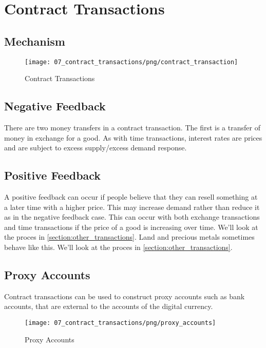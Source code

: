 \section{Contract Transactions}
\label{section:contract_transactions}

\subsection{Mechanism}

\begin{figure}[H]
\centering
\texttt{[image: 07\_contract\_transactions/png/contract\_transaction]}
\caption{Contract Transactions}
\label{fig:contract_transaction}
\end{figure}

\subsection{Negative Feedback}

There are two money transfers in a contract transaction. The first is a transfer of money in
exchange for a good. As with time transactions, interest rates are prices and are subject to
excess supply/excess demand response.

\subsection{Positive Feedback}

A positive feedback can occur if people believe that they can resell something at a later time
with a higher price. This may increase demand rather than reduce it as in the negative feedback
case.  This can occur with both exchange transactions and time transactions if the price of a good
is increasing over time. We'll look at the proces in \ref{section:other_transactions}. Land and
precious metals sometimes behave like this. We'll look at the proces in
\ref{section:other_transactions}.
 
\subsection{Proxy Accounts}

Contract transactions can be used to construct proxy accounts such as bank accounts, that are
external to the accounts of the digital currency.

\begin{figure}[H]
\centering
\texttt{[image: 07\_contract\_transactions/png/proxy\_accounts]}
\caption{Proxy Accounts}
\label{fig:proxy_accounts}
\end{figure}

